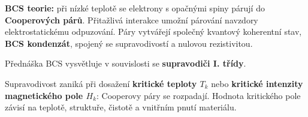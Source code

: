 \textbf{BCS teorie:} při nízké teplotě se elektrony s opačnými spiny párují do \textbf{Cooperových párů}. Přitažlivá interakce umožní párování navzdory elektrostatickému odpuzování. Páry vytvářejí společný kvantový koherentní stav, \textbf{BCS kondenzát}, spojený se supravodivostí a nulovou rezistivitou.

Přednáška BCS vysvětluje v souvislosti se \textbf{supravodiči I. třídy}.

Supravodivost zaniká při dosažení \textbf{kritické teploty $T_k$} nebo \textbf{kritické intenzity magnetického pole $H_k$}: Cooperovy páry se rozpadají. Hodnota kritického pole závisí na teplotě, struktuře, čistotě a vnitřním pnutí materiálu.
